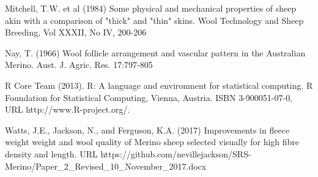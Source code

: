 \documentclass[titlepage]{article}  %
\begin{document}
\begin{thebibliography}{99}
Mitchell, T.W. et al (1984) Some physical and mechanical properties of sheep akin with a comparison of "thick" and "thin" skins. Wool Technology and Sheep Breeding, Vol XXXII, No IV, 200-206


Nay, T. (1966) Wool follicle arrangement and vascular pattern in the Australian Merino. Aust. J. Agric. Res. 17:797-805

R Core Team (2013). R: A language and environment for statistical
  computing. R Foundation for Statistical Computing, Vienna, Austria.
  ISBN 3-900051-07-0, URL http://www.R-project.org/.


Watts, J.E., Jackson, N., and Ferguson, K.A. (2017) Improvements in fleece weight weight and wool quality of Merino sheep selected visually for high fibre density and length. URL https://github.com/nevillejackson/SRS-Merino/Paper\_2\_Revised\_10\_November\_2017.docx 


\end{thebibliography}
\end{document}

